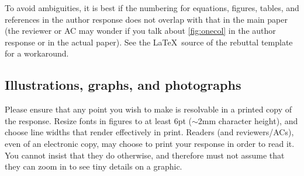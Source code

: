\documentclass[10pt,twocolumn,letterpaper]{article}
\begin{document}
To avoid ambiguities, it is best if the numbering for equations, figures, tables, and references in the author response does not overlap with that in the main paper (the reviewer or AC may wonder if you talk about \cref{fig:onecol} in the author response or in the actual paper).
See the \LaTeX\ source of the rebuttal template for a workaround.


\subsection{Illustrations, graphs, and photographs}

Please ensure that any point you wish to make is resolvable in a printed copy of the response.
Resize fonts in figures to at least 6\:pt ($\sim$2\:mm character height), and choose line widths that render effectively in print.
Readers (and reviewers/ACs), even of an electronic copy, may choose to print your response in order to read it.
You cannot insist that they do otherwise, and therefore must not assume that they can zoom in to see tiny details on a graphic.



{
    \small
    
    
}
\end{document}
